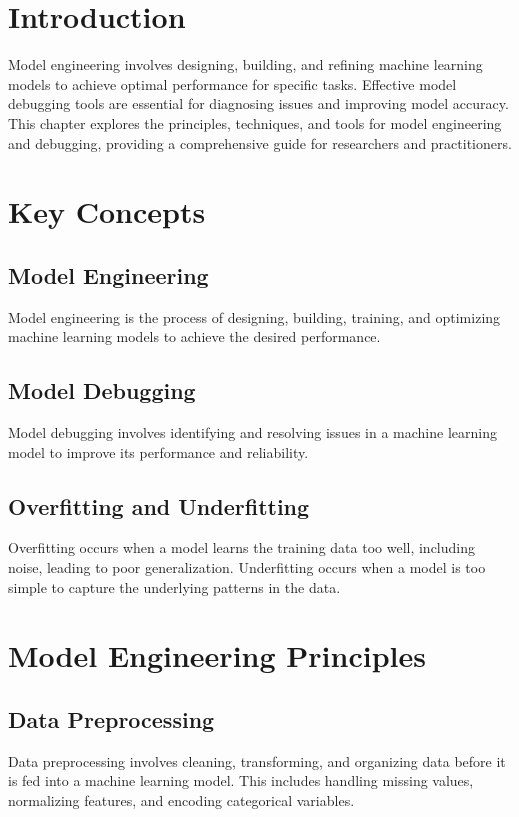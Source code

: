 \section{Introduction}
Model engineering involves designing, building, and refining machine learning models to achieve optimal performance for specific tasks. Effective model debugging tools are essential for diagnosing issues and improving model accuracy. This chapter explores the principles, techniques, and tools for model engineering and debugging, providing a comprehensive guide for researchers and practitioners.

\section{Key Concepts}

\subsection{Model Engineering}
Model engineering is the process of designing, building, training, and optimizing machine learning models to achieve the desired performance.

\subsection{Model Debugging}
Model debugging involves identifying and resolving issues in a machine learning model to improve its performance and reliability.

\subsection{Overfitting and Underfitting}
Overfitting occurs when a model learns the training data too well, including noise, leading to poor generalization. Underfitting occurs when a model is too simple to capture the underlying patterns in the data.

\section{Model Engineering Principles}

\subsection{Data Preprocessing}
Data preprocessing involves cleaning, transforming, and organizing data before it is fed into a machine learning model. This includes handling missing values, normalizing features, and encoding categorical variables.

